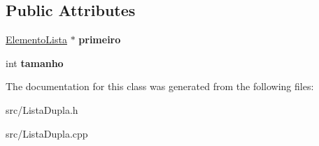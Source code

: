\subsection*{\-Public \-Attributes}
\begin{DoxyCompactItemize}
\item 
\hypertarget{classListaDupla_a4d3874a2ab716b9023ac4b5fd7d28d8b}{\hyperlink{classElementoLista}{\-Elemento\-Lista} $\ast$ {\bfseries primeiro}}\label{classListaDupla_a4d3874a2ab716b9023ac4b5fd7d28d8b}

\item 
\hypertarget{classListaDupla_ac9151cc5802c1702fa1ecb2b9e2022a3}{int {\bfseries tamanho}}\label{classListaDupla_ac9151cc5802c1702fa1ecb2b9e2022a3}

\end{DoxyCompactItemize}


\-The documentation for this class was generated from the following files\-:\begin{DoxyCompactItemize}
\item 
src/\-Lista\-Dupla.\-h\item 
src/\-Lista\-Dupla.\-cpp\end{DoxyCompactItemize}
